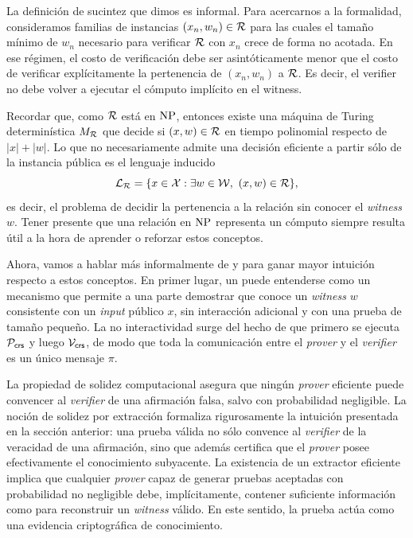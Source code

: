 La definición de sucintez que dimos es informal. Para acercarnos a la formalidad, consideramos familias de instancias $(x_n,w_n) \in \mathcal{R}$ para las cuales el tamaño mínimo de $w_n$ necesario para verificar $\mathcal{R}$ con $x_n$ crece de forma no acotada. En ese régimen, el costo de verificación debe ser asintóticamente menor que el costo de verificar explícitamente la pertenencia de $(x_n, w_n)$ a $\mathcal{R}$. Es decir, el verifier no debe volver a ejecutar el cómputo implícito en el witness.

Recordar que, como $\mathcal{R}$ está en $\mathrm{NP}$, entonces existe una máquina de Turing determinística $M_{\mathcal{R}}$ que decide si $(x,w) \in \mathcal{R}$ en tiempo polinomial respecto de $|x| + |w|$. Lo que no necesariamente admite una decisión eficiente a partir sólo de la instancia pública es el lenguaje inducido
$$\mathcal{L}_{\mathcal{R}} = \{x \in \mathcal{X} : \exists w \in \mathcal{W},\ (x,w) \in \mathcal{R}\},$$
es decir, el problema de decidir la pertenencia a la relación sin conocer el \textit{witness} $w$. Tener presente que una relación en $\mathrm{NP}$ representa un cómputo siempre resulta útil a la hora de aprender o reforzar estos conceptos.

Ahora, vamos a hablar más informalmente de \SNARK y \zkSNARK para ganar mayor intuición respecto a estos conceptos. En primer lugar, un \SNARK puede entenderse como un mecanismo que permite a una parte demostrar que conoce un \textit{witness} $w$ consistente con un \textit{input} público $x$, sin interacción adicional y con una prueba de tamaño pequeño. La no interactividad surge del hecho de que primero se ejecuta $\mathcal{P}_{\mathsf{crs}}$ y luego $\mathcal{V}_{\mathsf{crs}}$, de modo que toda la comunicación entre el \textit{prover} y el \textit{verifier} es un único mensaje $\pi$.

La propiedad de solidez computacional asegura que ningún \textit{prover} eficiente puede convencer al \textit{verifier} de una afirmación falsa, salvo con probabilidad negligible. La noción de solidez por extracción formaliza rigurosamente la intuición presentada en la sección anterior: una prueba válida no sólo convence al \textit{verifier} de la veracidad de una afirmación, sino que además certifica que el \textit{prover} posee efectivamente el conocimiento subyacente. La existencia de un extractor eficiente implica que cualquier \textit{prover} capaz de generar pruebas aceptadas con probabilidad no negligible debe, implícitamente, contener suficiente información como para reconstruir un \textit{witness} válido. En este sentido, la prueba actúa como una evidencia criptográfica de conocimiento.


